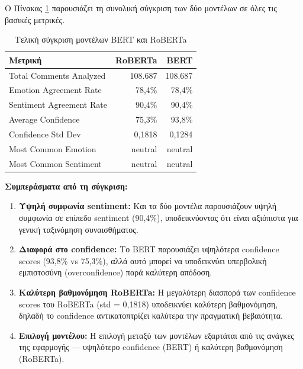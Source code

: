 \documentclass[a4paper,11pt,oneside,openany]{ioniothesis}
\begin{document}
Ο Πίνακας \ref{tab:final_comparison} παρουσιάζει τη συνολική σύγκριση των δύο μοντέλων σε όλες τις βασικές μετρικές.

\begin{table}[H]
\centering
\caption{Τελική σύγκριση μοντέλων BERT και RoBERTa}
\label{tab:final_comparison}
\begin{tabular}{@{}lrr@{}}
\toprule
\textbf{Μετρική} & \textbf{RoBERTa} & \textbf{BERT} \\
\midrule
Total Comments Analyzed & 108.687 & 108.687 \\
Emotion Agreement Rate & 78,4\% & 78,4\% \\
Sentiment Agreement Rate & 90,4\% & 90,4\% \\
Average Confidence & 75,3\% & 93,8\% \\
Confidence Std Dev & 0,1818 & 0,1284 \\
Most Common Emotion & neutral & neutral \\
Most Common Sentiment & neutral & neutral \\
\bottomrule
\end{tabular}
\end{table}

\textbf{Συμπεράσματα από τη σύγκριση:}

\begin{enumerate}
    \item \textbf{Υψηλή συμφωνία sentiment:} Και τα δύο μοντέλα παρουσιάζουν υψηλή συμφωνία σε επίπεδο sentiment (90,4\%), υποδεικνύοντας ότι είναι αξιόπιστα για γενική ταξινόμηση συναισθήματος.
    
    \item \textbf{Διαφορά στο confidence:} Το BERT παρουσιάζει υψηλότερα confidence scores (93,8\% vs 75,3\%), αλλά αυτό μπορεί να υποδεικνύει υπερβολική εμπιστοσύνη (overconfidence) παρά καλύτερη απόδοση.
    
    \item \textbf{Καλύτερη βαθμονόμηση RoBERTa:} Η μεγαλύτερη διασπορά των confidence scores του RoBERTa (std = 0,1818) υποδεικνύει καλύτερη βαθμονόμηση, δηλαδή το confidence αντικατοπτρίζει καλύτερα την πραγματική βεβαιότητα.
    
    \item \textbf{Επιλογή μοντέλου:} Η επιλογή μεταξύ των μοντέλων εξαρτάται από τις ανάγκες της εφαρμογής — υψηλότερο confidence (BERT) ή καλύτερη βαθμονόμηση (RoBERTa).
\end{enumerate}

\end{document}
